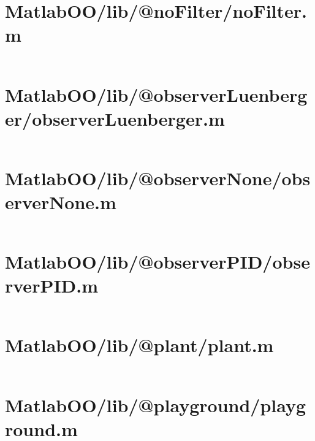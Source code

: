 \pagebreak
\section{MatlabOO/lib/@noFilter/noFilter.m}\label{code:MatlabOO/lib/@noFilter/noFilter.m}
\inputminted[linenos,fontsize=\scriptsize]{matlab}{/home/dcouture/git/mathyourlife/TSatPy/beta_versions/matlab_object_oriented/lib/@noFilter/noFilter.m}

\pagebreak
\section{MatlabOO/lib/@observerLuenberger/observerLuenberger.m}\label{code:MatlabOO/lib/@observerLuenberger/observerLuenberger.m}
\inputminted[linenos,fontsize=\scriptsize]{matlab}{/home/dcouture/git/mathyourlife/TSatPy/beta_versions/matlab_object_oriented/lib/@observerLuenberger/observerLuenberger.m}

\pagebreak
\section{MatlabOO/lib/@observerNone/observerNone.m}\label{code:MatlabOO/lib/@observerNone/observerNone.m}
\inputminted[linenos,fontsize=\scriptsize]{matlab}{/home/dcouture/git/mathyourlife/TSatPy/beta_versions/matlab_object_oriented/lib/@observerNone/observerNone.m}

\pagebreak
\section{MatlabOO/lib/@observerPID/observerPID.m}\label{code:MatlabOO/lib/@observerPID/observerPID.m}
\inputminted[linenos,fontsize=\scriptsize]{matlab}{/home/dcouture/git/mathyourlife/TSatPy/beta_versions/matlab_object_oriented/lib/@observerPID/observerPID.m}

\pagebreak
\section{MatlabOO/lib/@plant/plant.m}\label{code:MatlabOO/lib/@plant/plant.m}
\inputminted[linenos,fontsize=\scriptsize]{matlab}{/home/dcouture/git/mathyourlife/TSatPy/beta_versions/matlab_object_oriented/lib/@plant/plant.m}

\pagebreak
\section{MatlabOO/lib/@playground/playground.m}\label{code:MatlabOO/lib/@playground/playground.m}
\inputminted[linenos,fontsize=\scriptsize]{matlab}{/home/dcouture/git/mathyourlife/TSatPy/beta_versions/matlab_object_oriented/lib/@playground/playground.m}

